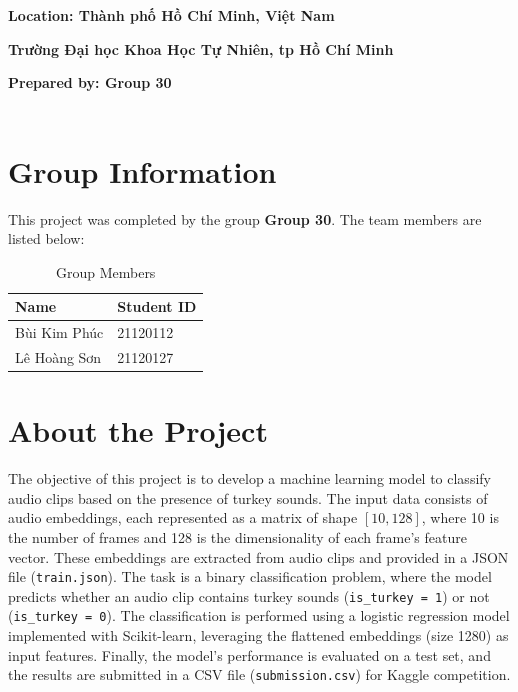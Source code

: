 \documentclass[12pt, a4paper]{article}
\begin{document}
\begin{titlepage}
    \large \textbf{Location: Thành phố Hồ Chí Minh, Việt Nam} \\

    \vspace{0.5cm}
    
    \large \textbf{Trường Đại học Khoa Học Tự Nhiên, tp Hồ Chí Minh} \\
    
    \vspace{1cm}
    
    \large \textbf{Prepared by: Group 30} \\

    \small {} \\
    
    \vfill
    
\end{titlepage}

\newpage

\section{Group Information}
This project was completed by the group \textbf{Group 30}. The team members are listed below:

\begin{table}[h]
    \centering
    \begin{tabular}{ll}
        \toprule
        \textbf{Name} & \textbf{Student ID} \\
        \midrule
        Bùi Kim Phúc & 21120112 \\
        Lê Hoàng Sơn & 21120127 \\
        \bottomrule
    \end{tabular}
    \caption{Group Members}
    \label{tab:group_members}
\end{table}

\section{About the Project}
The objective of this project is to develop a machine learning model to classify audio clips based on the presence of turkey sounds. The input data consists of audio embeddings, each represented as a matrix of shape $[10, 128]$, where 10 is the number of frames and 128 is the dimensionality of each frame’s feature vector. These embeddings are extracted from audio clips and provided in a JSON file (\texttt{train.json}). The task is a binary classification problem, where the model predicts whether an audio clip contains turkey sounds (\texttt{is\_turkey = 1}) or not (\texttt{is\_turkey = 0}). The classification is performed using a logistic regression model implemented with Scikit-learn, leveraging the flattened embeddings (size 1280) as input features.
Finally, the model's performance is evaluated on a test set, and the results are submitted in a CSV file (\texttt{submission.csv}) for Kaggle competition.
\end{document}
